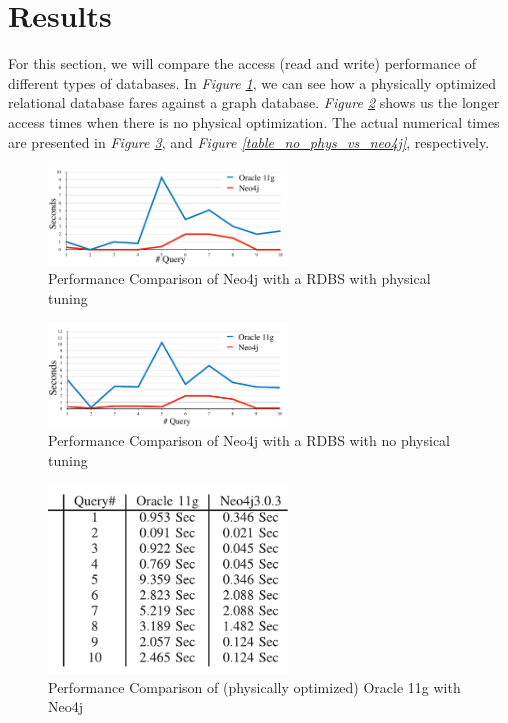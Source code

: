 \documentclass[10pt,        %
               a4paper,     %
               journal,     %
               ]{IEEEtran}
\begin{document}
\section{Results} 
For this section, we will compare the access (read and write) performance of different types of databases. In \textit{Figure \ref{graph_phys_vs_neo4j}}, we can see how a physically optimized relational database fares against a graph database. \textit{Figure \ref{graph_no_phys_vs_neo4j}} shows us the longer access times when there is no physical optimization. The actual numerical times are presented in \textit{Figure \ref{table_phys_vs_neo4j}}, and \textit{Figure \ref{table_no_phys_vs_neo4j}}, respectively. \par
\begin{figure}[!t]
	\centering
	\includegraphics[width=2.5in]{plots/phys_vs_neo4j}
	\caption{Performance Comparison of Neo4j with a RDBS with physical tuning \cite{IEEEpaper1:comparison}}
	\label{graph_phys_vs_neo4j}
\end{figure}

\begin{figure}[!t]
	\centering
	\includegraphics[width=2.5in]{plots/no phys vs neo4j}
	\caption{Performance Comparison of Neo4j with a RDBS with no physical tuning \cite{IEEEpaper1:comparison}}
	\label{graph_no_phys_vs_neo4j}
\end{figure}

\begin{figure}[!t]
	\centering
	\includegraphics[width=2.5in]{plots/phys vs neo4j table}
	\caption{Performance Comparison of (physically optimized) Oracle 11g with Neo4j \cite{IEEEpaper1:comparison}}
	\label{table_phys_vs_neo4j}
\end{figure}
\end{document}
